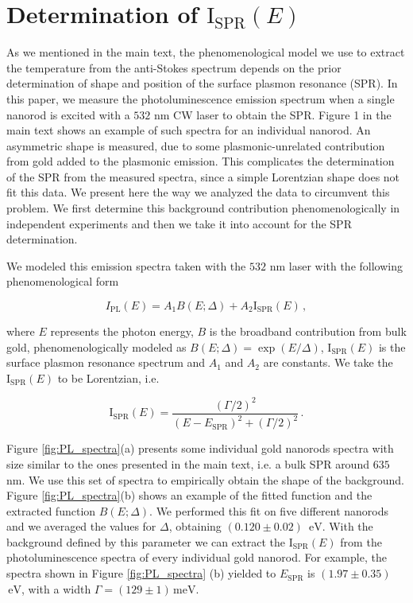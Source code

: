 \documentclass[journal=nalefd,manuscript=letter]{achemso}
\newcommand{\nm}{\ensuremath{\,\textrm{nm}}}
\newcommand{\eV}{\ensuremath{\,\textrm{eV}}}
\newcommand{\meV}{\ensuremath{\,\textrm{meV}}}
\begin{document}
\pagebreak
\section{Determination of $\textrm{I}_\textrm{SPR}(E)$}\label{sec:ISPR} 

As we mentioned in the main text, the phenomenological model we use to extract
the temperature from the anti-Stokes spectrum depends on the prior determination 
of shape and position of the surface plasmon resonance (SPR). 
In this paper, we measure the photoluminescence emission spectrum 
when a single nanorod is excited with a $532\,\nm$ CW laser to obtain the SPR. 
Figure 1 in the main text shows an example of such spectra for an individual nanorod. 
An asymmetric shape is measured, due to some plasmonic-unrelated contribution 
from gold\cite{Mooradian1969} added to the plasmonic emission. 
This complicates the determination of the SPR from the measured spectra, since a simple 
Lorentzian shape does not fit this data. 
We present here the way we analyzed the data to circumvent this problem.
We first determine this background contribution phenomenologically in independent experiments and then 
we take it into account for the SPR determination. 

We modeled this emission spectra taken with the $532$ nm laser with the following phenomenological form

\begin{equation}
I_{\textrm{PL}}(E) = A_1 B(E;\Delta) + A_2 \textrm{I}_\textrm{SPR}(E)\,,
\label{eq:spectra_model}
\end{equation}

where $E$ represents the photon energy, $B$ is the broadband contribution from bulk gold, 
phenomenologically modeled as $B(E;\Delta) = \exp(E/\Delta)$, $\textrm{I}_\textrm{SPR}(E)$ 
is the surface plasmon resonance spectrum and $A_1$ and $A_2$ are constants. 
We take the $\textrm{I}_\textrm{SPR}(E)$ to be Lorentzian\cite{Zijlstra2011}, i.e.  

\begin{equation}
\textrm{I}_{\textrm{SPR}}(E) = 
	\frac{\left( \Gamma/2 \right)^2}{\left( E-E_\textrm{SPR}\right)^2 +\left( \Gamma/2 \right)^2}\,.
\label{eq:ISPR}
\end{equation}

Figure \ref{fig:PL_spectra}(a) presents some individual gold nanorods spectra with 
size similar to the ones presented in the main text, i.e. a bulk SPR around $635$ nm. 
We use this set of spectra to empirically obtain the shape of the background.
Figure \ref{fig:PL_spectra}(b) shows an example of the fitted function and the extracted 
function $B(E;\Delta)$. We performed this fit on five different nanorods and we averaged 
the values for $\Delta$, obtaining $(0.120\pm0.02)$ \eV. With the background defined by 
this parameter we can extract the $\textrm{I}_{\textrm{SPR}}(E)$ from the photoluminescence 
spectra of every individual gold nanorod. For example, the spectra shown in Figure 
\ref{fig:PL_spectra} (b) yielded to $E_\textrm{SPR}$ is $(1.97 \pm 0.35)$ \eV, 
with a width $\Gamma=(129 \pm 1) \meV$.
\end{document}
